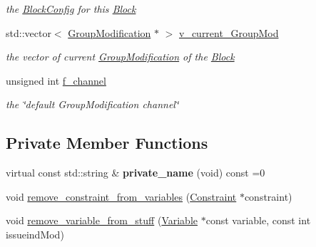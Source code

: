 \begin{DoxyCompactItemize}
\begin{DoxyCompactList}\small\item\em the \mbox{\hyperlink{class_s_m_spp__di__unipi__it_1_1_block_config}{Block\+Config}} for this \mbox{\hyperlink{class_s_m_spp__di__unipi__it_1_1_block}{Block}} \end{DoxyCompactList}\item 
\mbox{\label{class_s_m_spp__di__unipi__it_1_1_block_aad93ec00bdc4133cb5a26555595e8ea0}} 
std\+::vector$<$ \mbox{\hyperlink{class_s_m_spp__di__unipi__it_1_1_group_modification}{Group\+Modification}} $\ast$ $>$ \mbox{\hyperlink{class_s_m_spp__di__unipi__it_1_1_block_aad93ec00bdc4133cb5a26555595e8ea0}{v\+\_\+current\+\_\+\+Group\+Mod}}
\begin{DoxyCompactList}\small\item\em the vector of current \mbox{\hyperlink{class_s_m_spp__di__unipi__it_1_1_group_modification}{Group\+Modification}} of the \mbox{\hyperlink{class_s_m_spp__di__unipi__it_1_1_block}{Block}} \end{DoxyCompactList}\item 
\mbox{\label{class_s_m_spp__di__unipi__it_1_1_block_a588a8f0957b2407347b9d1a2566a2140}} 
unsigned int \mbox{\hyperlink{class_s_m_spp__di__unipi__it_1_1_block_a588a8f0957b2407347b9d1a2566a2140}{f\+\_\+channel}}
\begin{DoxyCompactList}\small\item\em the \char`\"{}default Group\+Modification channel\char`\"{} \end{DoxyCompactList}\end{DoxyCompactItemize}
\subsection*{Private Member Functions}
\begin{DoxyCompactItemize}
\item 
\mbox{\label{class_s_m_spp__di__unipi__it_1_1_block_aa74273c5d85179380eb4e54fd221fdc1}} 
virtual const std\+::string \& {\bfseries private\+\_\+name} (void) const =0
\item 
void \mbox{\hyperlink{class_s_m_spp__di__unipi__it_1_1_block_a10f535001a82e7e9950f3a69967ae56e}{remove\+\_\+constraint\+\_\+from\+\_\+variables}} (\mbox{\hyperlink{class_s_m_spp__di__unipi__it_1_1_constraint}{Constraint}} $\ast$constraint)
\item 
void \mbox{\hyperlink{class_s_m_spp__di__unipi__it_1_1_block_a164c030eea2f1b177de50db119a63a32}{remove\+\_\+variable\+\_\+from\+\_\+stuff}} (\mbox{\hyperlink{class_s_m_spp__di__unipi__it_1_1_variable}{Variable}} $\ast$const variable, const int issueind\+Mod)
\end{DoxyCompactItemize}
